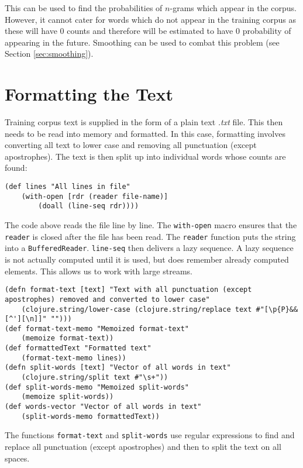 \noindent This can be used to find the probabilities of $n$-grams which appear in the corpus. However, it cannot cater for words which do not appear in the training corpus as these will have 0 counts and therefore will be estimated to have 0 probability of appearing in the future. Smoothing can be used to combat this problem (see Section \ref{sec:smoothing}).

\section{Formatting the Text} \label{sec:formattingText}

Training corpus text is supplied in the form of a plain text \textit{.txt} file. This then needs to be read into memory and formatted. In this case, formatting involves converting all text to lower case and removing all punctuation (except apostrophes). The text is then split up into individual words whose counts are found:

\begin{lstlisting}
(def lines "All lines in file" 
	(with-open [rdr (reader file-name)] 
		(doall (line-seq rdr))))
\end{lstlisting}

The code above reads the file line by line. The \lstinline!with-open! macro ensures that the \lstinline!reader! is closed after the file has been read. The \lstinline!reader! function puts the string into a \lstinline!BufferedReader!. \lstinline!line-seq! then delivers a lazy sequence. A lazy sequence is not actually computed until it is used, but does remember already computed elements. This allows us to work with large streams.

\begin{lstlisting}
(defn format-text [text] "Text with all punctuation (except apostrophes) removed and converted to lower case" 
	(clojure.string/lower-case (clojure.string/replace text #"[\p{P}&&[^'][\n]]" "")))
(def format-text-memo "Memoized format-text" 
	(memoize format-text))
(def formattedText "Formatted text" 
	(format-text-memo lines))
(defn split-words [text] "Vector of all words in text" 
	(clojure.string/split text #"\s+"))
(def split-words-memo "Memoized split-words" 
	(memoize split-words))
(def words-vector "Vector of all words in text" 
	(split-words-memo formattedText))
\end{lstlisting}

The functions \lstinline!format-text! and \lstinline!split-words! use regular expressions to find and replace all punctuation (except apostrophes) and then to split the text on all spaces. 

